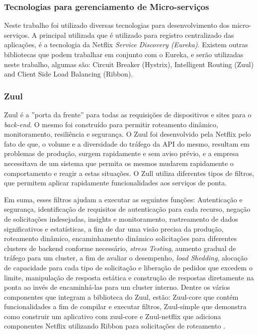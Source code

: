 \documentclass[journal]{IEEEtran}
\begin{document}
\subsubsection{Tecnologias para gerenciamento de Micro-serviços}
Neste trabalho foi utilizado diversas tecnologias para desenvolvimento dos micro-serviços. A principal utilizada que é utilizado para registro centralizado das aplicações, é a tecnologia da Netflix \emph{Service Discovery (Eureka)}. Existem outras bibliotecas que podem trabalhar em conjunto com o Eureka, e serão utilizadas neste trabalho, algumas são: Circuit Breaker (Hystrix), Intelligent Routing (Zuul) and Client Side Load Balancing (Ribbon). 

\subsubsection{Zuul}
Zuul é a ''porta da frente'' para todas as requisições de dispositivos e sites para o \emph{back-end}. O mesmo foi construído para permitir roteamento dinâmico, monitoramento, resiliência e segurança. O Zuul foi desenvolvido pela Netflix pelo fato de que, o volume e a diversidade do tráfego da API do mesmo, resultam em problemas de produção, surgem rapidamente e sem aviso prévio, e a empresa necessitava de um sistema que permita os mesmos mudarem rapidamente o comportamento e reagir a estas situações. O Zull utiliza diferentes tipos de filtros, que permitem aplicar rapidamente funcionalidades aos serviços de ponta. 

Em suma, esses filtros ajudam a executar as seguintes funções: Autenticação e segurança, identificação de requisitos de autenticação para cada recurso, negação de solicitações indesejadas, insights e monitoramento, rastreamento de dados significativos e estatísticas, a fim de dar uma visão precisa da produção, roteamento dinâmico, encaminhamento dinâmico solicitações para diferentes clusters de backend conforme necessário, \emph{stress Testing}, aumento gradual de tráfego para um cluster, a fim de avaliar o desempenho, \emph{load Shedding}, alocação de capacidade para cada tipo de solicitação e liberação de pedidos que excedem o limite, manipulação de resposta estática e construção de respostas diretamente na ponta ao invés de encaminhá-las para um cluster interno.
Dentre os vários componentes que integram a biblioteca do Zuul, estão: Zuul-core que contém funcionalidades a fim de compilar e executar filtros, Zuul-simple que demonstra como construir um aplicativo com zuul-core e Zuul-netflix que adiciona componentes Netflix utilizando Ribbon para solicitações de roteamento \cite{netflix2016Zuul}.
\end{document}
